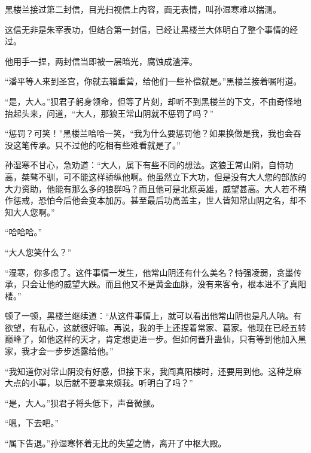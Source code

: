\begin{this_body}
黑楼兰接过第二封信，目光扫视信上内容，面无表情，叫孙湿寒难以揣测。

这信无非是朱宰表功，但结合第一封信，已经让黑楼兰大体明白了整个事情的经过。

他用手一捏，两封信当即被一层暗光，腐蚀成渣滓。

“潘平等人来到圣宫，你就去辎重营，给他们一些补偿就是。”黑楼兰接着嘱咐道。

“是，大人。”狈君子躬身领命，但等了片刻，却听不到黑楼兰的下文，不由奇怪地抬起头来，问道，“大人，那狼王常山阴就不惩罚了吗？”

“惩罚？可笑！”黑楼兰哈哈一笑，“我为什么要惩罚他？如果换做是我，我也会吞没这笔传承。只不过他的吃相有些难看就是了。”

孙湿寒不甘心，急劝道：“大人，属下有些不同的想法。这狼王常山阴，自恃功高，桀骜不驯，可不能这样骄纵他啊。他虽然立下大功，但是没有大人您的部族的大力资助，他能有那么多的狼群吗？而且他可是北原英雄，威望甚高。大人若不稍作惩戒，恐怕今后他会变本加厉。甚至最后功高盖主，世人皆知常山阴之名，却不知大人您啊。”

“哈哈哈。”

“大人您笑什么？”

“湿寒，你多虑了。这件事情一发生，他常山阴还有什么美名？恃强凌弱，贪墨传承，只会让他的威望大跌。而且他又不是黄金血脉，没有来客令，根本进不了真阳楼。”

顿了一顿，黑楼兰继续道：“从这件事情上，就可以看出他常山阴也是凡人呐。有欲望，有私心，这就很好嘛。再说，我的手上还捏着常家、葛家。他现在已经五转巅峰了，如他这样的天才，肯定想更进一步。但如何晋升蛊仙，只有等到他加入黑家，我才会一步步透露给他。”

“我知道你对常山阴没有好感，但接下来，我闯真阳楼时，还要用到他。这种芝麻大点的小事，以后就不要拿来烦我。听明白了吗？”

“是，大人。”狈君子将头低下，声音微颤。

“嗯，下去吧。”

“属下告退。”孙湿寒怀着无比的失望之情，离开了中枢大殿。

\end{this_body}

